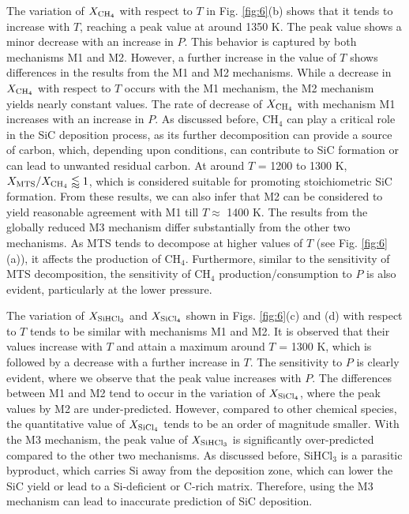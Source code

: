 \documentclass[final, letterpaper, square, comma, numbers, sort&compress]{elsarticle}
\begin{document}
The variation of $X_{\rm CH_4}$ with respect to $T$ in Fig. \ref{fig:6}(b) shows that it tends to increase with $T$, reaching a peak value at around 1350 K. The peak value shows a minor decrease with an increase in $P$. This behavior is captured by both mechanisms M1 and M2. However, a further increase in the value of $T$ shows differences in the results from the M1 and M2 mechanisms. While a decrease in $X_{\rm CH_4}$ with respect to $T$ occurs with the M1 mechanism, the M2 mechanism yields nearly constant values. The rate of decrease of $X_{\rm CH_4}$ with mechanism M1 increases with an increase in $P$. As discussed before, CH$_4$ can play a critical role in the SiC deposition process, as its further decomposition can provide a source of carbon, which, depending upon conditions, can contribute to SiC formation or can lead to unwanted residual carbon. At around $T$ = 1200 to 1300 K,
$X_{\rm MTS}/X_{\rm CH_4} \lessapprox 1$, which is considered suitable for promoting stoichiometric SiC formation. From these results, we can also infer that M2 can be considered to yield reasonable agreement with M1 till $T \approx$ 1400 K. The results from the globally reduced M3 mechanism differ substantially from the other two mechanisms. As MTS tends to decompose at higher values of $T$ (see Fig. \ref{fig:6}(a)), it affects the production of CH$_4$. Furthermore, similar to the sensitivity of MTS decomposition, the sensitivity of CH$_4$ production/consumption to $P$ is also evident, particularly at the lower pressure.

The variation of $X_{\rm SiHCl_3}$ and $X_{\rm SiCl_4}$ shown in Figs. \ref{fig:6}(c) and (d) with respect to $T$ tends to be similar with mechanisms M1 and M2. It is observed that their values increase with $T$ and attain a maximum around $T$ = 1300 K, which is followed by a decrease with a further increase in $T$. The sensitivity to $P$ is clearly evident, where we observe that the peak value increases with $P$. The differences between M1 and M2 tend to occur in the variation of $X_{\rm SiCl_4}$, where the peak values by M2 are under-predicted. However, compared to other chemical species, the quantitative value of $X_{\rm SiCl_4}$ tends to be an order of magnitude smaller. With the M3 mechanism, the peak value of $X_{\rm SiHCl_3}$ is significantly over-predicted compared to the other two mechanisms. As discussed before, SiHCl$_3$ is a parasitic byproduct, which carries Si away from the deposition zone, which can lower the SiC yield or lead to a Si-deficient or C-rich matrix. Therefore, using the M3 mechanism can lead to inaccurate prediction of SiC deposition.
\end{document}
